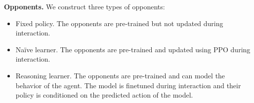 \documentclass{article}
\begin{document}

\textbf{Opponents.} We construct three types of opponents:
\vspace{-2mm}
\begin{itemize}[leftmargin = 2em]
	\setlength\itemsep{0em}
	\item {Fixed policy.} The opponents are pre-trained but not updated during interaction.
	\item {Na\"ive learner.} The opponents are pre-trained and updated using PPO during interaction.
	\item {Reasoning learner.} The opponents are pre-trained and can model the behavior of the agent. The model is finetuned during interaction and their policy is conditioned on the predicted action of the model. %
\end{itemize}
\vspace{-1mm}

\end{document}
